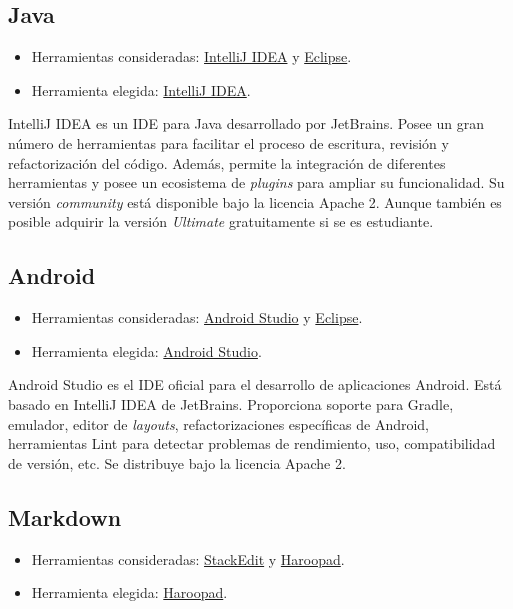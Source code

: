 \subsection{Java}\label{java}

\begin{itemize}
\tightlist
\item
  Herramientas consideradas:
  \href{https://www.jetbrains.com/idea/}{IntelliJ IDEA} y
  \href{https://eclipse.org/}{Eclipse}.
\item
  Herramienta elegida: \href{https://www.jetbrains.com/idea/}{IntelliJ
  IDEA}.
\end{itemize}

IntelliJ IDEA es un IDE para Java desarrollado por JetBrains. Posee un
gran número de herramientas para facilitar el proceso de escritura,
revisión y refactorización del código. Además, permite la integración de
diferentes herramientas y posee un ecosistema de \emph{plugins} para
ampliar su funcionalidad. Su versión \emph{community} está disponible
bajo la licencia Apache 2. Aunque también es posible adquirir la versión
\emph{Ultimate} gratuitamente si se es estudiante.

\subsection{Android}\label{android}

\begin{itemize}
\tightlist
\item
  Herramientas consideradas:
  \href{https://developer.android.com/studio/index.html}{Android Studio}
  y \href{https://eclipse.org/}{Eclipse}.
\item
  Herramienta elegida:
  \href{https://developer.android.com/studio/index.html}{Android
  Studio}.
\end{itemize}

Android Studio es el IDE oficial para el desarrollo de aplicaciones
Android. Está basado en IntelliJ IDEA de JetBrains. Proporciona soporte
para Gradle, emulador, editor de \emph{layouts}, refactorizaciones
específicas de Android, herramientas Lint para detectar problemas de
rendimiento, uso, compatibilidad de versión, etc. Se distribuye bajo la
licencia Apache 2.

\subsection{Markdown}\label{markdown}

\begin{itemize}
\tightlist
\item
  Herramientas consideradas: \href{https://stackedit.io/}{StackEdit} y
  \href{http://pad.haroopress.com/}{Haroopad}.
\item
  Herramienta elegida: \href{http://pad.haroopress.com/}{Haroopad}.
\end{itemize}

